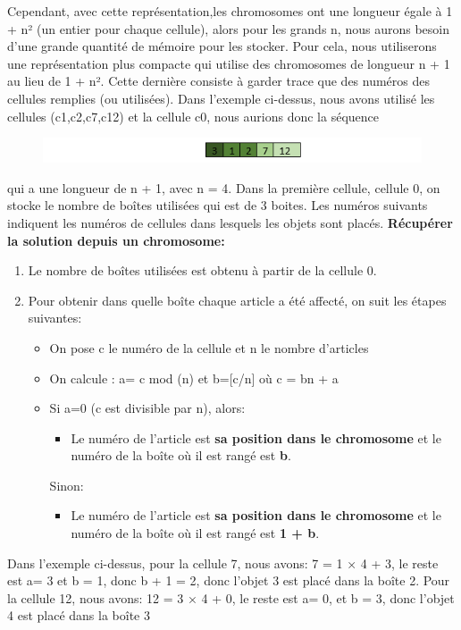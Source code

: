 \documentclass{article}
\begin{document}
Cependant, avec cette représentation,les chromosomes ont une longueur égale à 1 + n² (un entier pour chaque cellule), alors pour les grands n, nous aurons besoin d'une grande quantité de mémoire pour les stocker.
Pour cela, nous utiliserons une représentation plus compacte qui utilise des chromosomes de longueur n + 1 au lieu de 1 + n². Cette dernière consiste à garder trace que des numéros des cellules remplies (ou utilisées).
\newline
Dans l'exemple ci-dessus, nous avons utilisé les cellules (c1,c2,c7,c12) et la cellule c0, nous aurions donc la séquence 
\begin{figure}[H]
  \includegraphics[width=\linewidth]{../figures/pic03.PNG}
\end{figure}
qui a une longueur de n + 1, avec n = 4. 
\newline
\newline
Dans la première cellule, cellule 0, on stocke le nombre de boîtes utilisées qui est de 3 boites. Les numéros suivants indiquent les numéros de cellules dans lesquels les objets sont placés.
\newline
\newline
\textbf{Récupérer la solution depuis un chromosome: }
\begin{enumerate}
	\item Le nombre de boîtes utilisées est obtenu à partir de la cellule 0. 
	\item Pour obtenir dans quelle boîte chaque article a été affecté, on suit les étapes suivantes: 
	\begin{itemize}
		\item On pose c le numéro de la cellule et n le nombre d’articles
		\item On calcule : a= c mod (n) et b=[c/n] où c = bn + a
		\item  Si a=0  (c est divisible par n), alors: 
		\begin{itemize}
			\item Le numéro de l’article est\textbf{ sa position dans le chromosome} et le numéro de la boîte où il est rangé  est \textbf{b}.
		\end{itemize}
		Sinon:
		\begin{itemize}
			\item Le numéro de l’article est \textbf{sa position dans le chromosome} et le numéro de la boîte où il est rangé est \textbf{1 + b}.
		\end{itemize}
	\end{itemize}
\end{enumerate}
Dans l'exemple ci-dessus, pour la cellule 7, nous avons: 7 = 1 × 4 + 3, 
le reste est a= 3 et b = 1, donc b + 1 = 2, donc l'objet 3 est placé dans la boîte 2. 
Pour la cellule 12, nous avons: 12 = 3 × 4 + 0, le reste est a= 0, et b = 3, donc l'objet 4 est placé dans la boîte 3
\end{document}
